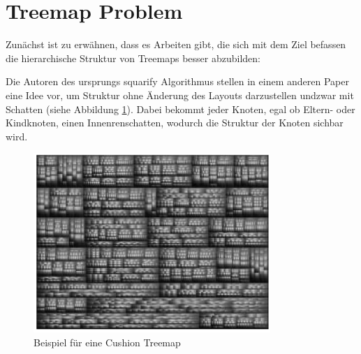 \section{Treemap Problem}
Zunächst ist zu erwähnen, dass es Arbeiten gibt, die sich mit dem Ziel befassen die hierarchische Struktur von Treemaps besser abzubilden:

Die Autoren des ursprungs squarify Algorithmus \cite{bruls2000squarified} stellen in einem anderen Paper \cite{cushionTreemaps} eine Idee vor, um Struktur ohne Änderung des Layouts darzustellen undzwar mit Schatten (siehe Abbildung \ref{fig:cushion}). Dabei bekommt jeder Knoten, egal ob Eltern- oder Kindknoten, einen Innenrenschatten, wodurch die Struktur der Knoten sichbar wird.

\begin{figure}
    \centering
    \includegraphics[width=0.8\textwidth]{images/cushionTreemap.png}
    \caption{Beispiel für eine Cushion Treemap \cite[4]{cushionTreemaps}}
    \label{fig:cushion}
\end{figure}

